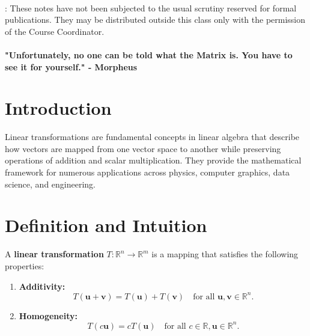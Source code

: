 \documentclass[11pt]{article}
\newcommand{\lecturenumber}{7}
\begin{document}
		\begin{center}
			\ \\
		\end{center}
		
		: {These notes have not been subjected to the
			usual scrutiny reserved for formal publications.  They may be distributed
			outside this class only with the permission of the Course Coordinator.}
		\vspace*{4mm}
		\setcounter{section}{\lecturenumber}
	\paragraph{"Unfortunately, no one can be told what the Matrix is. You have to see it for yourself." - Morpheus }
    

\section{\textbf{Introduction}}
Linear transformations are fundamental concepts in linear algebra that describe how vectors are mapped from one vector space to another while preserving operations of addition and scalar multiplication. They provide the mathematical framework for numerous applications across physics, computer graphics, data science, and engineering. 

\section{\textbf{Definition and Intuition}}

A \textbf{linear transformation} \( T: \mathbb{R}^n \to \mathbb{R}^m \) is a mapping that satisfies the following properties:

\begin{enumerate}
    \item \textbf{Additivity:} 
    \[
    T(\mathbf{u} + \mathbf{v}) = T(\mathbf{u}) + T(\mathbf{v}) \quad \text{for all } \mathbf{u}, \mathbf{v} \in \mathbb{R}^n.
    \]
    \item \textbf{Homogeneity:} 
    \[
    T(c\mathbf{u}) = cT(\mathbf{u}) \quad \text{for all } c \in \mathbb{R}, \mathbf{u} \in \mathbb{R}^n.
    \]
\end{enumerate}
\end{document}
